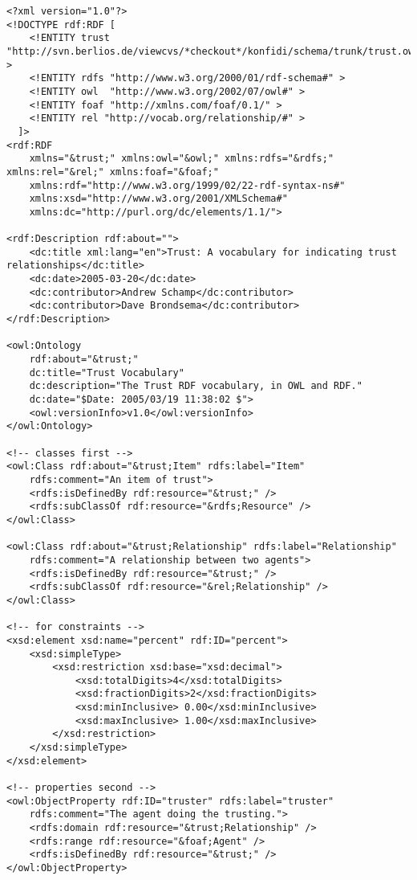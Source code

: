 \begin{verbatim}
<?xml version="1.0"?>
<!DOCTYPE rdf:RDF [
    <!ENTITY trust "http://svn.berlios.de/viewcvs/*checkout*/konfidi/schema/trunk/trust.owl#" >
    <!ENTITY rdfs "http://www.w3.org/2000/01/rdf-schema#" >
    <!ENTITY owl  "http://www.w3.org/2002/07/owl#" >
    <!ENTITY foaf "http://xmlns.com/foaf/0.1/" >
    <!ENTITY rel "http://vocab.org/relationship/#" >
  ]>
<rdf:RDF 
    xmlns="&trust;" xmlns:owl="&owl;" xmlns:rdfs="&rdfs;" xmlns:rel="&rel;" xmlns:foaf="&foaf;"
    xmlns:rdf="http://www.w3.org/1999/02/22-rdf-syntax-ns#" 
    xmlns:xsd="http://www.w3.org/2001/XMLSchema#"
    xmlns:dc="http://purl.org/dc/elements/1.1/">

<rdf:Description rdf:about="">
    <dc:title xml:lang="en">Trust: A vocabulary for indicating trust relationships</dc:title>
    <dc:date>2005-03-20</dc:date>
    <dc:contributor>Andrew Schamp</dc:contributor>
    <dc:contributor>Dave Brondsema</dc:contributor>
</rdf:Description>

<owl:Ontology 
    rdf:about="&trust;" 
    dc:title="Trust Vocabulary" 
    dc:description="The Trust RDF vocabulary, in OWL and RDF." 
    dc:date="$Date: 2005/03/19 11:38:02 $"> 
    <owl:versionInfo>v1.0</owl:versionInfo>
</owl:Ontology>

<!-- classes first -->
<owl:Class rdf:about="&trust;Item" rdfs:label="Item" 
    rdfs:comment="An item of trust">
    <rdfs:isDefinedBy rdf:resource="&trust;" />
    <rdfs:subClassOf rdf:resource="&rdfs;Resource" />
</owl:Class>

<owl:Class rdf:about="&trust;Relationship" rdfs:label="Relationship"
    rdfs:comment="A relationship between two agents">
    <rdfs:isDefinedBy rdf:resource="&trust;" />
    <rdfs:subClassOf rdf:resource="&rel;Relationship" />
</owl:Class>

<!-- for constraints -->
<xsd:element xsd:name="percent" rdf:ID="percent">
    <xsd:simpleType>
        <xsd:restriction xsd:base="xsd:decimal">
            <xsd:totalDigits>4</xsd:totalDigits>
            <xsd:fractionDigits>2</xsd:fractionDigits>
            <xsd:minInclusive> 0.00</xsd:minInclusive>
            <xsd:maxInclusive> 1.00</xsd:maxInclusive>
        </xsd:restriction>
    </xsd:simpleType>
</xsd:element>

<!-- properties second -->
<owl:ObjectProperty rdf:ID="truster" rdfs:label="truster"
    rdfs:comment="The agent doing the trusting.">
    <rdfs:domain rdf:resource="&trust;Relationship" />
    <rdfs:range rdf:resource="&foaf;Agent" />
    <rdfs:isDefinedBy rdf:resource="&trust;" />
</owl:ObjectProperty>


\end{verbatim}
